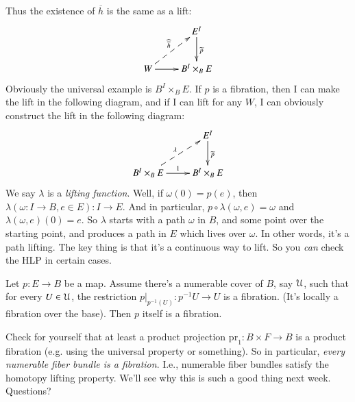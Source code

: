 Thus the existence of $\overline{h}$ is the same as a lift:
\begin{equation*}
    \xymatrix{
	& E^I\ar[d]^{\widetilde{p}}\\
	W\ar[r]\ar@{-->}[ur]^{\widehat{\overline{h}}} & B^I\times_B E
    }
\end{equation*}
Obviously the universal example is $B^I\times_B E$. If $p$ is a fibration, then I can make the lift in the following diagram, and if I can lift for any $W$, I can obviously construct the lift in the following diagram:
\begin{equation*}
    \xymatrix{
	& E^I\ar[d]^{\widetilde{p}}\\
	B^I\times_B E\ar@{-->}[ur]^\lambda\ar[r]^1 & B^I\times_B E
    }
\end{equation*}
We say $\lambda$ is a \emph{lifting function}. Well, if $\omega(0) = p(e)$, then $\lambda(\omega:I\to B, e\in E):I\to E$. And in particular, $p\circ\lambda(\omega, e) = \omega$ and $\lambda(\omega,e)(0) = e$. So $\lambda$ starts with a path $\omega$ in $B$, and some point over the starting point, and produces a path in $E$ which lives over $\omega$. In other words, it's a path lifting. The key thing is that it's a continuous way to lift. So you \emph{can} check the HLP in certain cases.
\begin{theorem}[Dold]
    Let $p:E\to B$ be a map. Assume there's a numerable cover of $B$, say $\mathcal U$, such that for every $U\in\mathcal U$, the restriction $p|_{p^{-1}(U)}:p^{-1}U\to U$ is a fibration. (It's locally a fibration over the base). Then $p$ itself is a fibration.
\end{theorem}
Check for yourself that at least a product projection $\mathrm{pr}_1:B\times F\to B$ is a product fibration (e.g. using the universal property or something). So in particular, \emph{every numerable fiber bundle is a fibration}. I.e., numerable fiber bundles satisfy the homotopy lifting property. We'll see why this is such a good thing next week. Questions?
